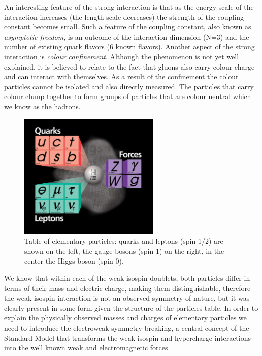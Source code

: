 An interesting feature of the strong interaction is that as the energy scale of the interaction 
increases (the length scale decreases) the strength of the coupling constant becomes small.
Such a feature of the coupling constant,
 also known as {\it asymptotic freedom},
 is an outcome of the interaction dimension (N=3) and the number of existing
quark flavors (6 known flavors).
 Another aspect of the strong interaction is {\it colour
confinement}. Although the phenomenon is not yet well explained, it is believed to
 relate to the fact that gluons also carry colour charge and can interact
with themselves. As a result of the confinement the colour particles 
cannot be isolated and also directly measured. The particles that carry colour
 clump together to form groups of particles that are colour neutral which we know as the hadrons.

\begin{figure}
\centering
\includegraphics[width=0.6\textwidth]{plots/intro/Higgs_SM.jpeg}
\caption{Table of elementary particles: quarks and leptons (spin-1/2) are shown on the left,
the gauge bosons (spin-1) on the right, in the center the Higgs boson (spin-0).
\label{fig:parttable}}

\end{figure}

We know that within each of the weak isospin doublets, both particles 
differ in terms of their
mass and electric charge, making them distinguishable,
 therefore the weak isospin interaction is
 not an observed symmetry of nature, but it was clearly present
in some form given the structure of the particles table. 
In order to explain the physically observed masses and charges of elementary
 particles we need to introduce the electroweak symmetry breaking, a central concept
of the Standard Model that transforms the
weak isospin and hypercharge interactions into the well known weak and electromagnetic forces.



